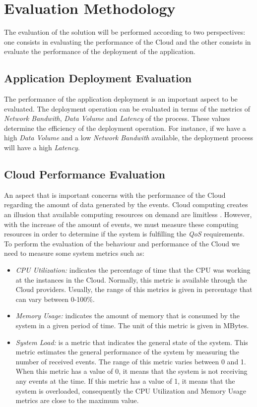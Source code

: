 \section{Evaluation Methodology}
\label{sec:evaluation}
The evaluation of the solution will be performed according to two perspectives: one consists in
evaluating the performance of the Cloud and the other consists in evaluate the performance
of the deployment of the application.
\subsection{Application Deployment Evaluation}
\label{sub:application_deployment_evaluation}
The performance of the application deployment is an important aspect to be evaluated.
The deployment operation can be evaluated in terms of the metrics of \textit{Network Bandwith},
\textit{Data Volume} and \textit{Latency} of the process. These values determine
the efficiency of the deployment operation. For instance, if we have a high \textit{Data Volume}
and a low \textit{Network Bandwith} available, the deployment process will have a high
\textit{Latency}.     
\subsection{Cloud Performance Evaluation}
\label{subs:cloud_performance_evaluation}
An aspect that is important concerns with the performance of the Cloud regarding the amount
of data generated by the events. Cloud computing creates an illusion that available computing
resources on demand are limitless \cite{armbrust2009m}. However, with the increase of the amount of
events, we must measure these computing resources in order to determine if the system is fulfilling
the \textit{QoS} requirements. To perform the evaluation of the behaviour and performance of the Cloud
we need to measure some system metrics such as:
\begin{itemize}
  \item \textit{CPU Utilization:} indicates the percentage of time that the CPU was working at
  the instances in the Cloud. Normally, this metric is available through the Cloud providers.
  Usually, the range of this metrics is given in percentage that can vary between 0-100\%.
  \item \textit{Memory Usage:} indicates the amount of memory that is consumed by the system in a
  given period of time. The unit of this metric is given in MBytes.
  \item \textit{System Load:} is a metric that indicates the general state of the system.
  This metric estimates the general performance of the system by measuring the number of received events.
  The range of this metric varies between 0 and 1. When this metric has a value of 0, it means that the
  system is not receiving any events at the time. If this metric has a value of 1, it means that the system
  is overloaded, consequently the CPU Utilization and Memory Usage metrics are close to the maximum value.
\end{itemize}

